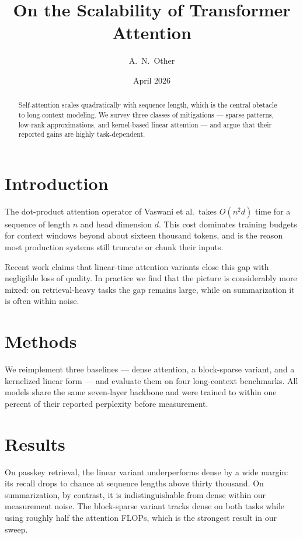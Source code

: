\documentclass[11pt]{article}
\title{On the Scalability of Transformer Attention}
\author{A.\ N.\ Other}
\date{April 2026}
\begin{document}
\maketitle

\begin{abstract}
Self-attention scales quadratically with sequence length, which is the central obstacle to long-context modeling. We survey three classes of mitigations --- sparse patterns, low-rank approximations, and kernel-based linear attention --- and argue that their reported gains are highly task-dependent.
\end{abstract}

\section{Introduction}

The dot-product attention operator of Vaswani et al.\ takes $O(n^2 d)$ time for a sequence of length $n$ and head dimension $d$. This cost dominates training budgets for context windows beyond about sixteen thousand tokens, and is the reason most production systems still truncate or chunk their inputs.

Recent work claims that linear-time attention variants close this gap with negligible loss of quality. In practice we find that the picture is considerably more mixed: on retrieval-heavy tasks the gap remains large, while on summarization it is often within noise.

\section{Methods}

We reimplement three baselines --- dense attention, a block-sparse variant, and a kernelized linear form --- and evaluate them on four long-context benchmarks. All models share the same seven-layer backbone and were trained to within one percent of their reported perplexity before measurement.

\section{Results}

On passkey retrieval, the linear variant underperforms dense by a wide margin: its recall drops to chance at sequence lengths above thirty thousand. On summarization, by contrast, it is indistinguishable from dense within our measurement noise. The block-sparse variant tracks dense on both tasks while using roughly half the attention FLOPs, which is the strongest result in our sweep.
\end{document}
